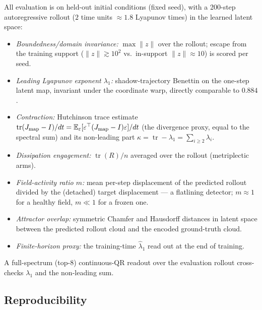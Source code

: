 \documentclass[11pt]{article}
\newcommand{\E}{\mathbb{E}}
\newcommand{\tr}{\operatorname{tr}}
\begin{document}
All evaluation is on held-out initial conditions (fixed seed), with a
200-step autoregressive rollout ($2$ time units $\approx1.8$ Lyapunov
times) in the learned latent space:
\begin{itemize}
\item \emph{Boundedness/domain invariance:} $\max\|z\|$ over the rollout;
escape from the training support ($\|z\|\gtrsim10^2$ vs.\ in-support
$\|z\|\approx10$) is scored per seed.
\item \emph{Leading Lyapunov exponent $\lambda_1$:} shadow-trajectory
Benettin on the one-step latent map, invariant under the coordinate
warp, directly comparable to $0.884$.
\item \emph{Contraction:} Hutchinson trace estimate
$\tr(J_{\rm map}-I)/dt=\E_\varepsilon[\varepsilon^\top(J_{\rm map}-I)\varepsilon]/dt$
(the divergence proxy, equal to the spectral sum) and its non-leading
part $\kappa=\tr-\lambda_1=\sum_{i\ge2}\lambda_i$.
\item \emph{Dissipation engagement:} $\tr(R)/n$ averaged over the
rollout (metriplectic arms).
\item \emph{Field-activity ratio $m$:} mean per-step displacement of the
predicted rollout divided by the (detached) target displacement --- a
flatlining detector; $m\approx1$ for a healthy field, $m\ll1$ for a
frozen one.
\item \emph{Attractor overlap:} symmetric Chamfer and Hausdorff
distances in latent space between the predicted rollout cloud and the
encoded ground-truth cloud.
\item \emph{Finite-horizon proxy:} the training-time $\hat\lambda_1$
read out at the end of training.
\end{itemize}
A full-spectrum (top-8) continuous-QR readout over the evaluation
rollout cross-checks $\lambda_1$ and the non-leading sum.

\subsection{Reproducibility}
\label{sec:methods-repro}
\end{document}
